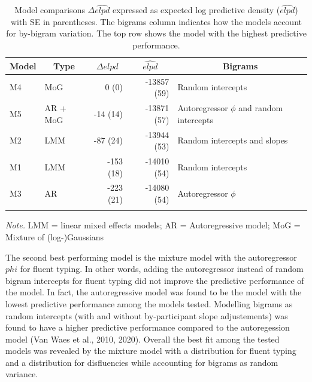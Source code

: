 \documentclass[english,jou,floatsintext]{apa7}
\begin{document}
\begin{table}[!ht]

\begin{center}
\begin{threeparttable}

\caption{\label{tab:modelcomparisons}Model comparisons $\Delta\widehat{elpd}$ expressed as expected log predictive density ($\widehat{elpd}$) with SE in parentheses. The bigrams column indicates how the models account for by-bigram variation. The top row shows the model with the highest predictive performance.}

\begin{tabular}{llrrl}
\toprule
Model & \multicolumn{1}{c}{Type} & \multicolumn{1}{c}{$\Delta\widehat{elpd}$} & \multicolumn{1}{c}{$\widehat{elpd}$} & \multicolumn{1}{c}{Bigrams}\\
\midrule
M4 & MoG & 0 (0) & -13857 (59) & Random intercepts\\
M5 & AR + MoG & -14 (14) & -13871 (57) & Autoregressor $\phi$ and random intercepts\\
M2 & LMM & -87 (24) & -13944 (53) & Random intercepts and slopes\\
M1 & LMM & -153 (18) & -14010 (54) & Random intercepts\\
M3 & AR & -223 (21) & -14080 (54) & Autoregressor $\phi$\\
\bottomrule
\addlinespace
\end{tabular}

\begin{tablenotes}[para]
\normalsize{\textit{Note.} LMM = linear mixed effects models; AR = Autoregressive model; MoG = Mixture of (log-)Gaussians}
\end{tablenotes}

\end{threeparttable}
\end{center}

\end{table}

The second best performing model is the mixture model with the autoregressor \(phi\) for fluent typing. In other words, adding the autoregressor instead of random bigram intercepts for fluent typing did not improve the predictive performance of the model. In fact, the autoregressive model was found to be the model with the lowest predictive performance among the models tested. Modelling bigrams as random intercepts (with and without by-participant slope adjustements) was found to have a higher predictive performance compared to the autoregession model (Van Waes et al., 2010, 2020). Overall the best fit among the tested models was revealed by the mixture model with a distribution for fluent typing and a distribution for disfluencies while accounting for bigrams as random variance.
\end{document}
